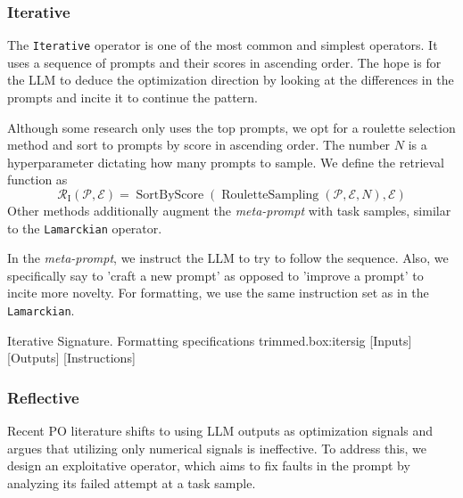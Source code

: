 \subsubsection{Iterative}
The \texttt{Iterative} operator is one of the most common and simplest operators. 
It uses a sequence of prompts and their scores in ascending order.
The hope is for the LLM to deduce the optimization direction by looking at the differences in the prompts and incite it to continue the pattern.

Although some research\cite{yang2024largelanguagemodelsoptimizers} only uses the top prompts, we opt for a roulette selection method
and sort to prompts by score in ascending order. The number $N$ is a hyperparameter dictating how many prompts to sample.
We define the retrieval function as
\begin{equation}
   \mathcal{R}_{\text{I}}(\mathscr{P}, \mathcal{E}) = \operatorname{SortByScore}(\operatorname{RouletteSampling}(\mathscr{P}, \mathcal{E}, N), \mathcal{E})
\end{equation}
Other methods\cite{tang2024unleashingpotentiallargelanguage} additionally augment the \textit{meta-prompt} with task samples, similar to the \texttt{Lamarckian} operator.

In the \textit{meta-prompt}, we instruct the LLM to try to follow the sequence. Also, we specifically say to 'craft a new prompt'
as opposed to 'improve a prompt' to incite more novelty. For formatting, we use the same instruction set as in the \texttt{Lamarckian}.
\begin{figurebox}{Iterative Signature. Formatting specifications trimmed.}{box:itersig}
    [Inputs]
    [Outputs]
    [Instructions]
\end{figurebox}

\subsubsection{Reflective}
Recent PO literature\cite{xiang2025selfsupervisedpromptoptimization} shifts to using LLM outputs as optimization signals
and argues that utilizing only numerical signals is ineffective. To address this, we design an exploitative operator, which
aims to fix faults in the prompt by analyzing its failed attempt at a task sample. 

